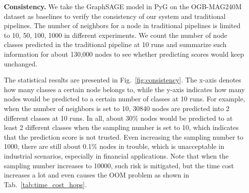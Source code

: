 \documentclass[conference]{IEEEtran}
\begin{document}
\textbf{Consistency.} 
We take the GraphSAGE model in PyG on the OGB-MAG240M dataset as baselines to verify the consistency of our system and traditional pipelines.
The number of neighbors for a node in traditional pipelines is limited to 10, 50, 100, 1000 in different experiments.
We count the number of node classes predicted in the traditional pipeline at 10 runs and summarize such information for about 130,000 nodes to see whether predicting scores would keep unchanged.

The statistical results are presented in Fig.~\ref{fig:consistency}.
The x-axis denotes how many classes a certain node belongs to, while the y-axis indicates how many nodes would be predicted to a certain number of classes at 10 runs.
For example, when the number of neighbors is set to 10, 30840 nodes are predicted into 2 different classes at 10 runs. %
In all, about 30\% nodes would be predicted to at least 2 different classes when the sampling number is set to 10, which indicates that the prediction score is not trusted.
Even increasing the sampling number to 1000, there are still about 0.1\% nodes in trouble, which is unacceptable in industrial scenarios, especially in financial applications.
Note that when the sampling number increases to 10000, such risk is mitigated, but the time cost increases a lot and even causes the OOM problem as shown in Tab.~\ref{tab:time_cost_hops}.



\end{document}
